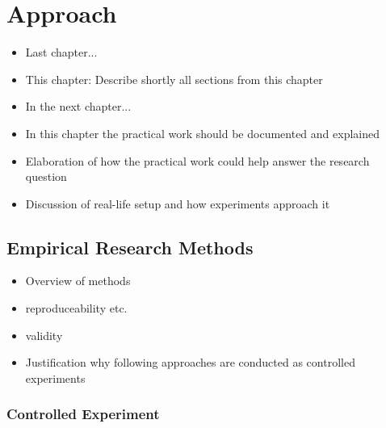 \chapter{Approach}

\begin{itemize}
	\item Last chapter...
	\item This chapter: Describe shortly all sections from this chapter
	\item In the next chapter...
\end{itemize}

\begin{itemize}
\item In this chapter the practical work should be documented and explained
\item Elaboration of how the practical work could help answer the research question
\item Discussion of real-life setup and how experiments approach it
\end{itemize}









\section{Empirical Research Methods}

\begin{itemize}
\item Overview of methods
\item reproduceability etc.
\item validity
\item Justification why following approaches are conducted as controlled experiments
\end{itemize}







\subsection{Controlled Experiment}


